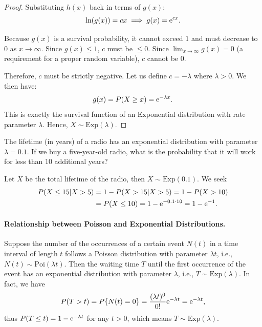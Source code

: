 \begin{proof}
  Substituting \(h(x)\) back in terms of \(g(x)\):
  \[
    \ln(g(x)) = cx \implies g(x) = \mathrm{e}^{cx}.
  \]

  Because \(g(x)\) is a survival probability, it cannot exceed \(1\) and must decrease to \(0\) as \(x \to \infty\). Since \(g(x) \leq 1\), \(c\) must be \(\leq 0\). Since \(\lim_{x \to \infty} g(x) = 0\) (a requirement for a proper random variable), \(c\) cannot be \(0\).

  Therefore, \(c\) must be strictly negative. Let us define \(c = -\lambda\) where \(\lambda > 0\). We then have:
  \[
    g(x) = P(X \geq x) = \mathrm{e}^{-\lambda x}.
  \]
  This is exactly the survival function of an Exponential distribution with rate parameter $\lambda$. Hence, $X \sim \mathrm{Exp}(\lambda)$.
\end{proof}

\begin{example}
  The lifetime (in years) of a radio has an exponential distribution with parameter \(\lambda = 0.1\). If we buy a five-year-old radio, what is the probability that it will work for less than 10 additional years?
\end{example}

\begin{solution}
  Let \(X\) be the total lifetime of the radio, then \(X \sim \mathrm{Exp}(0.1)\). We seek
  \begin{align*}
    P(X \leq 15 | X > 5) & = 1 - P(X > 15 | X > 5) = 1 - P(X > 10) \\
    & = P(X \leq 10) = 1 - \mathrm{e}^{-0.1 \cdot 10} = 1 - \mathrm{e}^{-1}. \qedhere
  \end{align*}
\end{solution}

\paragraph{Relationship between Poisson and Exponential Distributions.} Suppose the number of the occurrences of a certain event \(N(t)\) in a time interval of length \(t\) follows a Poisson distribution with parameter \(\lambda t\), i.e., \(N(t) \sim \mathrm{Poi}(\lambda t)\). Then the waiting time \(T\) until the first occurrence of the event has an exponential distribution with parameter \(\lambda\), i.e., \(T \sim \mathrm{Exp}(\lambda)\). In fact, we have
\[
  P(T > t) = P\{N(t) = 0\} = \frac{(\lambda t)^0}{0!} \mathrm{e}^{-\lambda t} = \mathrm{e}^{-\lambda t},
\]
thus \(P(T \leq t) = 1 - \mathrm{e}^{-\lambda t}\) for any \(t > 0\), which means \(T \sim \mathrm{Exp}(\lambda)\).

